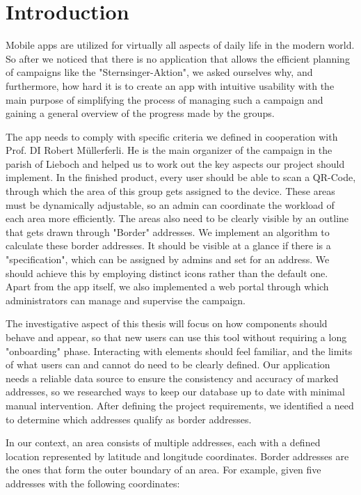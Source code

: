 \section{Introduction}

Mobile apps are utilized for virtually all aspects of daily life in the modern world. So after we noticed that there is no application that allows the efficient planning of campaigns like the "Sternsinger-Aktion", we asked ourselves why, and furthermore, how hard it is to create an app with intuitive usability with the main purpose of simplifying the process of managing such a campaign and gaining a general overview of the progress made by the groups.

\blankLine

The app needs to comply with specific criteria we defined in cooperation with Prof. DI Robert Müllerferli. He is the main organizer of the campaign in the parish of Lieboch and helped us to work out the key aspects our project should implement. In the finished product, every user should be able to scan a QR-Code, through which the area of this group gets assigned to the device. These areas must be dynamically adjustable, so an admin can coordinate the workload of each area more efficiently. The areas also need to be clearly visible by an outline that gets drawn through "Border" addresses. We implement an algorithm to calculate these border addresses. It should be visible at a glance if there is a "specification", which can be assigned by admins and set for an address. We should achieve this by employing distinct icons rather than the default one. Apart from the app itself, we also implemented a web portal through which administrators can manage and supervise the campaign. 

\blankLine

The investigative aspect of this thesis will focus on how components should behave and appear, so that new users can use this tool without requiring a long "onboarding" phase. Interacting with elements should feel familiar, and the limits of what users can and cannot do need to be clearly defined. Our application needs a reliable data source to ensure the consistency and accuracy of marked addresses, so we researched ways to keep our database up to date with minimal manual intervention. After defining the project requirements, we identified a need to determine which addresses qualify as border addresses. 

\pagebreak

In our context, an area consists of multiple addresses, each with a defined location represented by latitude and longitude coordinates. Border addresses are the ones that form the outer boundary of an area. For example, given five addresses with the following coordinates:


